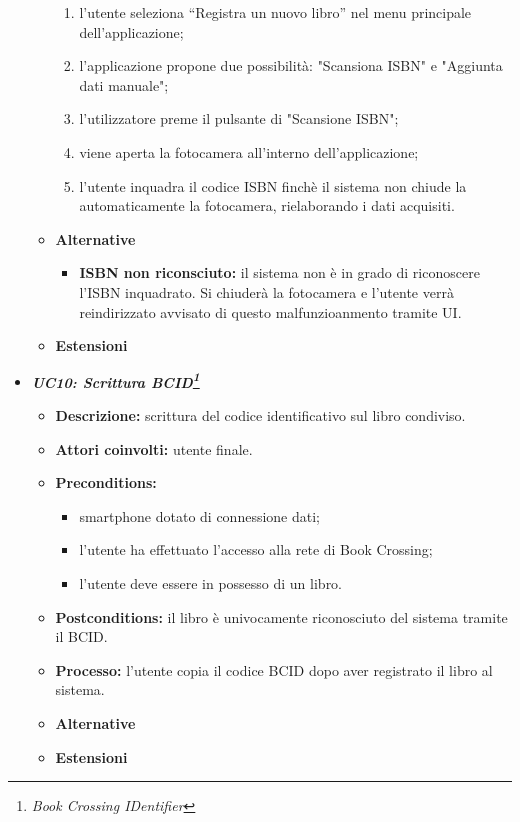\begin{itemize}
\begin{itemize}
\begin{enumerate}
			\item l’utente seleziona “Registra un nuovo libro” nel menu principale dell’applicazione;
			\item l’applicazione propone due possibilità: "Scansiona ISBN" e "Aggiunta dati manuale";
			\item l'utilizzatore preme il pulsante di "Scansione ISBN";
			\item viene aperta la fotocamera all'interno dell'applicazione;
			\item l'utente inquadra il codice ISBN finchè il sistema non chiude la automaticamente la fotocamera, rielaborando i dati acquisiti.
		\end{enumerate}
		\item \textbf{Alternative}
		\begin{itemize}
			\item \textbf{ISBN non riconsciuto:} il sistema non è in grado di riconoscere l'ISBN inquadrato. Si chiuderà la fotocamera e l'utente verrà reindirizzato avvisato di questo malfunzioanmento tramite UI.
		\end{itemize}
		\item \textbf{Estensioni}
	\end{itemize}
	\item \textbf{\textit{UC10: Scrittura BCID\footnote{\textit{Book Crossing IDentifier}}}}
	\begin{itemize}
		\item \textbf{Descrizione:} scrittura del codice identificativo sul libro condiviso.
		\item \textbf{Attori coinvolti:} utente finale.
		\item \textbf{Preconditions:}
		\begin{itemize}
			\item smartphone dotato di connessione dati;
			\item l’utente ha effettuato l’accesso alla rete di Book Crossing;
			\item l'utente deve essere in possesso di un libro.
		\end{itemize}
		\item \textbf{Postconditions:} il libro è univocamente riconosciuto del sistema tramite il BCID.
		\item \textbf{Processo:} l'utente copia il codice BCID dopo aver registrato il libro al sistema.
		\item \textbf{Alternative}
		\item \textbf{Estensioni}
	\end{itemize}

\end{itemize}

